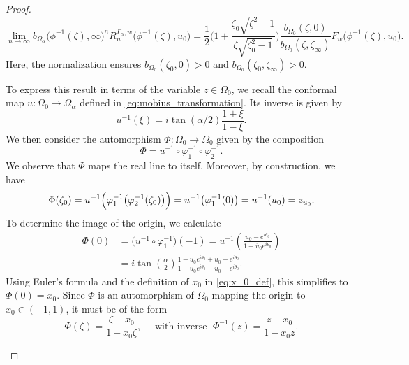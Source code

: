 \documentclass[12pt,oneside,reqno]{amsart}
\theoremstyle{definition}
\numberwithin{equation}{section}
\begin{document}
\begin{proof}
\begin{equation}
    \lim_{n\rightarrow \infty}b_{\Omega_\alpha}\bigl(\phi^{-1}(\zeta),\infty\bigr)^nR_n^{\Gamma_\alpha,w}\bigl(\phi^{-1}(\zeta),u_0\bigr) = \frac{1}{2} \biggl(1+\frac{\zeta_0 \sqrt{\zeta^2-1}}{\zeta \sqrt{\zeta_0^2-1}}\biggr)\frac{b_{\Omega_0}(\zeta,0)}{b_{\Omega_0}(\zeta,\zeta_\infty)}F_w\bigl(\phi^{-1}(\zeta),u_0\bigr).
    \label{eq:auxilliary_limit}
\end{equation}
Here, the normalization ensures $b_{\Omega_0}(\zeta_0,0)>0$ and $b_{\Omega_0}(\zeta_0,\zeta_\infty)>0$.



To express this result in terms of the variable $z \in \Omega_0$, we recall the conformal map $u: \Omega_0 \to \Omega_\alpha$ defined in \eqref{eq:mobius_transformation}. Its inverse is given by
\begin{equation}
    u^{-1}(\xi) = i\tan(\alpha/{2})\frac{1+\xi}{1-\xi}.
\end{equation}
We then consider the automorphism $\Phi : \Omega_0 \to \Omega_0$ given by the composition
\begin{equation}
    \Phi = u^{-1} \circ \varphi_1^{-1} \circ \varphi_2^{-1}.
\end{equation}
We observe that $\Phi$ maps the real line to itself. Moreover, by construction, we have
\[
    \Phi(\zeta_0) = u^{-1}\Bigl(\varphi_1^{-1}\bigl(\varphi_2^{-1}(\zeta_0)\bigr)\Bigr) = u^{-1}\bigl(\varphi_1^{-1}(0)\bigr) = u^{-1}(u_0) = z_{u_0}.
\]
To determine the image of the origin, we calculate
\begin{align*}
	\Phi(0) & = \bigl( u^{-1}\circ\varphi_1^{-1}\bigr)(-1) 
	 = u^{-1}\left(\frac{u_0-e^{i\theta_0}}{1-\overline{u}_0e^{i\theta_0}}\right) \\
	& = i\tan\left(\frac{\alpha}{2}\right)\frac{1-\overline{u}_0e^{i\theta_0}+u_0-e^{i\theta_0}}{1-\overline{u}_0e^{i\theta_0}-u_0+e^{i\theta_0}}.
\end{align*}
Using Euler's formula and the definition of $x_0$ in \eqref{eq:x_0_def}, this simplifies to $\Phi(0) = x_0$. 
Since $\Phi$ is an automorphism of $\Omega_0$ mapping the origin to $x_0 \in (-1,1)$, it must be of the form
\begin{equation}
    \Phi(\zeta) = \frac{\zeta + x_0}{1 + x_0 \zeta}, \quad \mbox{ with inverse } \; \Phi^{-1}(z) = \frac{z - x_0}{1 - x_0 z}.
    \label{eq:Phi_def}
\end{equation}



\begin{figure}[h]
\begin{center}
\begin{tikzpicture}[scale=1.7]


\end{tikzpicture}
\end{center}
\end{figure}
\end{proof}
\end{document}
